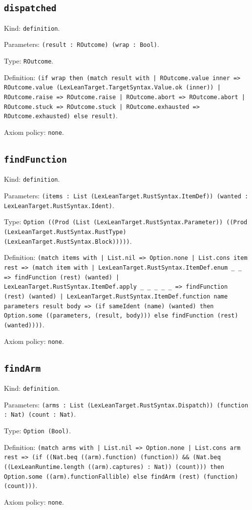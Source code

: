 \documentclass[11pt]{article}
\begin{document}
\subsection*{\texttt{dispatched}}
\noindent Kind: \texttt{definition}.\par
\noindent Parameters: \texttt{(result : ROutcome) (wrap : Bool)}.\par
\noindent Type: \texttt{ROutcome}.\par
\noindent Definition: \texttt{(if wrap then (match result with | ROutcome.value inner => ROutcome.value (LexLeanTarget.TargetSyntax.Value.ok (inner)) | ROutcome.raise => ROutcome.raise | ROutcome.abort => ROutcome.abort | ROutcome.stuck => ROutcome.stuck | ROutcome.exhausted => ROutcome.exhausted) else result)}.\par
\noindent Axiom policy: \texttt{none}.\par
\subsection*{\texttt{findFunction}}
\noindent Kind: \texttt{definition}.\par
\noindent Parameters: \texttt{(items : List (LexLeanTarget.RustSyntax.ItemDef)) (wanted : LexLeanTarget.RustSyntax.Ident)}.\par
\noindent Type: \texttt{Option ((Prod (List (LexLeanTarget.RustSyntax.Parameter)) ((Prod (LexLeanTarget.RustSyntax.RustType) (LexLeanTarget.RustSyntax.Block)))))}.\par
\noindent Definition: \texttt{(match items with | List.nil => Option.none | List.cons item rest => (match item with | LexLeanTarget.RustSyntax.ItemDef.enum \_ \_ => findFunction (rest) (wanted) | LexLeanTarget.RustSyntax.ItemDef.apply \_ \_ \_ \_ \_ => findFunction (rest) (wanted) | LexLeanTarget.RustSyntax.ItemDef.function name parameters result body => (if sameIdent (name) (wanted) then Option.some ((parameters, (result, body))) else findFunction (rest) (wanted))))}.\par
\noindent Axiom policy: \texttt{none}.\par
\subsection*{\texttt{findArm}}
\noindent Kind: \texttt{definition}.\par
\noindent Parameters: \texttt{(arms : List (LexLeanTarget.RustSyntax.Dispatch)) (function : Nat) (count : Nat)}.\par
\noindent Type: \texttt{Option (Bool)}.\par
\noindent Definition: \texttt{(match arms with | List.nil => Option.none | List.cons arm rest => (if ((Nat.beq ((arm).function) (function)) \&\& (Nat.beq ((LexLeanRuntime.length ((arm).captures) : Nat)) (count))) then Option.some ((arm).functionFallible) else findArm (rest) (function) (count)))}.\par
\noindent Axiom policy: \texttt{none}.\par
\end{document}
